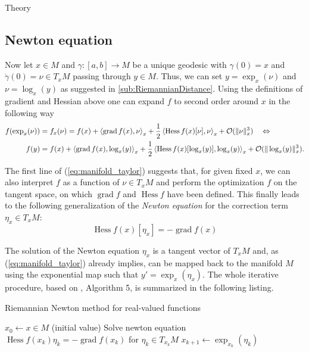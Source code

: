 \begin{chapter}{Theory}
\subsection{Newton equation} %
\label{sub:Newton equation}
Now let $x\in M$ and $\gamma:[a,b] \to M$ be a unique geodesic with $\gamma(0)=x$ and $\dot{\gamma}(0)=\nu\in T_xM$ 
passing through $y\in M$. Thus, we can set $y=\exp_x(\nu)$ and $\nu=\log_x(y)$ as suggested in \ref{sub:RiemannianDistance}. Using the
definitions of gradient and Hessian above one can expand $f$ to second order around $x$ in the following way
\begin{align}
    \label{eq:manifold_taylor}
    f(\exp_x(\nu)) &= f_x(\nu) = f(x) + \left\langle \operatorname{grad}f(x),\nu \right\rangle_x + \frac{1}{2}\left\langle \operatorname{Hess}f(x)[\nu],\nu \right\rangle_x + \mathcal{O}(\| \nu \|_x^3)\quad \Leftrightarrow \\
    f(y) &= f(x) + \left\langle \operatorname{grad}f(x),\log_x(y) \right\rangle_x + \frac{1}{2}\left\langle \operatorname{Hess}f(x)[\log_x(y)],\log_x(y) \right\rangle_x + \mathcal{O}(\| \log_x(y) \|_x^3).\nonumber
\end{align}

The first line of (\ref{eq:manifold_taylor}) suggests that, for given fixed $x$, we can also interpret $f$ as a function of $\nu\in T_xM$ and perform the optimization $f$ on the
tangent space, on which $\operatorname{grad}f$ and $\operatorname{Hess}f$ have been defined. This finally leads to the following generalization of the \emph{Newton equation}
for the correction term $\eta_x \in T_xM$:
\begin{equation}
    \label{eq:newtoneq}
    \operatorname{Hess}f(x)[\eta_x]=-\operatorname{grad}f(x)
\end{equation}

The solution of the Newton equation $\eta_x$ is a tangent vector of $T_xM$ and, as (\ref{eq:manifold_taylor}) already implies, can be mapped back to the manifold $M$ 
using the exponential map such that $y'=\exp_x(\eta_x)$. The whole iterative procedure, based on \cite{Absil2009}, Algorithm 5, is summarized in the following listing.
\begin{algorithm}
\caption{Riemannian Newton method for real-valued functions}
\label{al:real_riemannian_newton}
\begin{algorithmic}
\STATE $x_0 \leftarrow x\in M$ (initial value)
\STATE Solve newton equation $\operatorname{Hess} f(x_k)\eta_k = -\operatorname{grad} f(x_k)$ for $\eta_k\in T_{x_k}M$
\STATE $x_{k+1} \leftarrow \exp_{x_k}(\eta_k)$
\ENDFOR
\end{algorithmic}
\end{algorithm}


\end{chapter}
